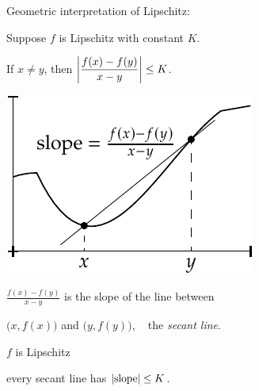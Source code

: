 \documentclass[10pt,aspectratio=169]{beamer}
\begin{document}
\begin{frame}
Geometric interpretation of Lipschitz:

\pause
\medskip

Suppose $f$ is Lipschitz with constant $K$.

\pause
\medskip

If $x \not= y$, then
\quad
$\displaystyle
\left\lvert {\frac{f(x)-f(y)}{x-y}} \right\rvert \leq K$.

\pause
\vspace*{-0.3in}
\hspace*{2.5in}
\includegraphics{../figures/lipschitzfig}

\vspace*{-1.0in}

$\frac{f(x)-f(y)}{x-y}$ is the slope of the line
between

$\bigl(x,f(x)\bigr)$ and $\bigl(y,f(y)\bigr)$,
~
the \emph{secant line}.

\pause
\medskip

$f$ is Lipschitz

\wiffif

every secant line has $\left\lvert {\text{slope}} \right\rvert \leq K$.

\end{frame}
\end{document}
